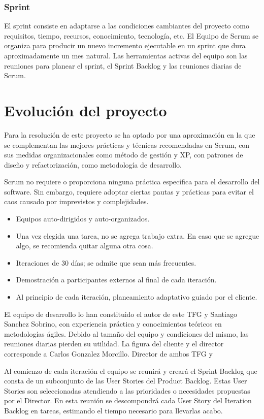 \subsubsection{Sprint}
 El sprint consiste en adaptarse a las condiciones cambiantes del proyecto como requisitos, tiempo, recursos, conocimiento, tecnología, etc. El Equipo de Scrum se organiza para producir un nuevo incremento ejecutable en un sprint que dura aproximadamente un mes natural. Las herramientas activas del equipo son las reuniones para planear el sprint, el Sprint Backlog y las reuniones diarias de Scrum.

\section{Evolución del proyecto}

Para la resolución de este proyecto se ha optado por una aproximación en la que se complementan las mejores prácticas y técnicas recomendadas en Scrum, con sus medidas organizacionales como método de gestión y XP, con patrones de diseño y refactorización, como metodología de desarrollo.

Scrum no requiere o proporciona ninguna práctica específica para el desarrollo del software. Sin embargo, requiere adoptar ciertas pautas y prácticas para evitar el caos causado por imprevistos y complejidades.
\begin{itemize}
\item Equipos auto-dirigidos y auto-organizados. 
\item Una vez elegida una tarea, no se agrega trabajo extra. En caso que se agregue algo, se recomienda quitar alguna otra cosa.
\item Iteraciones de 30 días; se admite que sean más frecuentes.
\item Demostración a participantes externos al final de cada iteración. 
\item Al principio de cada iteración, planeamiento adaptativo guiado por el cliente.
\end{itemize}

El  equipo  de  desarrollo  lo  han constituido el autor de este TFG y Santiago Sanchez Sobrino, con  experiencia  práctica y conocimientos teóricos en metodologías  ágiles. Debido  al  tamaño  del  equipo  y  condiciones  del  mismo,  las  reuniones  diarias pierden su utilidad. La figura del cliente y el director corresponde a Carlos Gonzalez Morcillo. Director de ambos TFG y 

Al comienzo de cada iteración el equipo se reunirá y creará el Sprint Backlog que consta de un subconjunto de las User Stories del Product Backlog. Estas User Stories son seleccionadas atendiendo a las prioridades o necesidades propuestas por el Director. En esta reunión se descompondrá cada User Story del Iteration Backlog en tareas, estimando el tiempo necesario para llevarlas acabo. 

